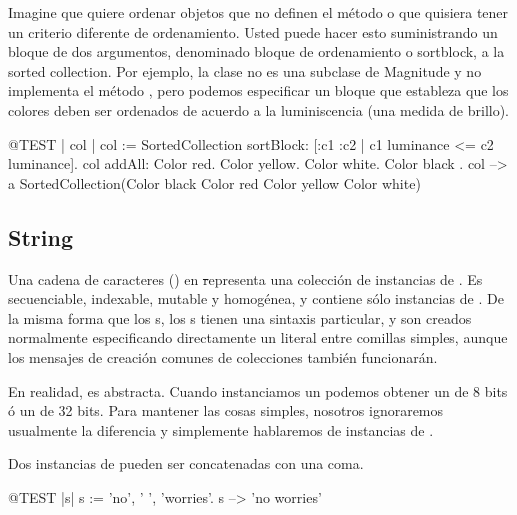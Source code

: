 \documentclass[a4paper,10pt,twoside]{book}
\begin{document}
Imagine que quiere ordenar objetos que no definen el m\'etodo \ct{<=} o que quisiera tener un criterio diferente de ordenamiento. Usted puede hacer esto suministrando un bloque de dos argumentos, denominado bloque de ordenamiento o sortblock, a la sorted collection. Por ejemplo, la clase  no es una subclase de Magnitude y no implementa el m\'etodo \ct{<=}, pero podemos especificar un bloque que estableza que los colores deben ser ordenados de acuerdo a la luminiscencia (una medida de brillo).

\begin{code}{@TEST | col |}
col := SortedCollection sortBlock: [:c1 :c2 | c1 luminance <= c2 luminance].
col addAll: { Color red. Color yellow. Color white. Color black }.
col --> a SortedCollection(Color black Color red Color yellow Color white)
\end{code}

\subsection{String}
Una cadena de caracteres () en \st representa una colecci\'on de instancias de .
Es secuenciable, indexable, mutable y homog\'enea, y contiene s\'olo instancias de .
De la misma forma que los s, los s tienen una sintaxis particular, y son creados normalmente especificando directamente un literal entre comillas simples, aunque los mensajes de creaci\'on comunes de colecciones tambi\'en funcionar\'an.


En realidad,  es abstracta.
Cuando instanciamos un  podemos obtener un  de 8 bits \'o un  de 32 bits.
Para mantener las cosas simples, nosotros ignoraremos usualmente la diferencia y simplemente hablaremos de instancias de .

Dos instancias de  pueden ser concatenadas con una coma.
\begin{code}{@TEST |s|}
s := 'no', ' ', 'worries'.
s -->  'no worries'
\end{code}
\end{document}
